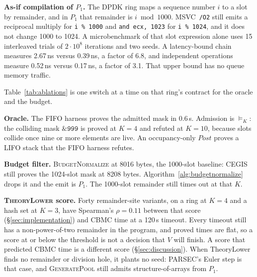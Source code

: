 \textbf{As-if compilation of \(P_1\).}
The DPDK ring maps a sequence number \(i\) to a slot by remainder, and in
\(P_1\) that remainder is \(i \bmod 1000\). MSVC~\texttt{/O2} still emits a
reciprocal multiply for \texttt{i \% 1000} and \texttt{and ecx, 1023} for
\texttt{i \% 1024}, and it does not change 1000 to 1024. A microbenchmark of
that slot expression alone uses 15 interleaved trials of
\(2\cdot 10^8\) iterations and two seeds. A latency-bound chain measures
2.67\,ns versus 0.39\,ns, a factor of 6.8, and independent operations
measure 0.52\,ns versus 0.17\,ns, a factor of 3.1. That upper bound has no
queue memory traffic.

\label{sec:ablations}
Table~\ref{tab:ablations} is one switch at a time on that ring's contract
for the oracle and the budget.

\begin{table}
\caption{Four switches on the DPDK ring: FIFO oracle, \(\models_K\),
occupancy-only \(\mathit{Post}\), and an 8016-byte ceiling.}
\label{tab:ablations}

\end{table}

\textbf{Oracle.} The FIFO harness proves the admitted mask in 0.6\,s.
Admission is \(\models_K\): the colliding mask \(\texttt{\& 999}\) is
proved at \(K=4\) and refuted at \(K=10\), because slots collide once nine
or more elements are live.
\label{sec:bounded_gap}
An occupancy-only \(\mathit{Post}\) proves a LIFO stack that the FIFO
harness refutes.

\textbf{Budget filter.}
\label{sec:budget_eval}
\textsc{BudgetNormalize} at 8016 bytes, the 1000-slot baseline: CEGIS still
proves the 1024-slot mask at 8208 bytes. Algorithm~\ref{alg:budgetnormalize}
drops it and the emit is \(P_1\). The 1000-slot remainder still times out
at that \(K\).

\textbf{\textsc{TheoryLower} score.}
\label{sec:score_eval}
Forty remainder-site variants, on a ring at \(K=4\) and a hash set at
\(K=3\), have Spearman's \(\rho = 0.11\) between that score
(\S\ref{sec:implementation}) and CBMC time at a 120\,s timeout.
Every timeout still has a non-power-of-two remainder in the program, and
proved times are flat, so a score at or below the threshold is not a
decision that \(V\) will finish. A score that predicted CBMC time is a
different score (\S\ref{sec:discussion}). When TheoryLower finds no
remainder or division hole, it plants no seed: PARSEC's Euler step is that
case, and \textsc{GeneratePool} still admits structure-of-arrays from
\(P_1\).

